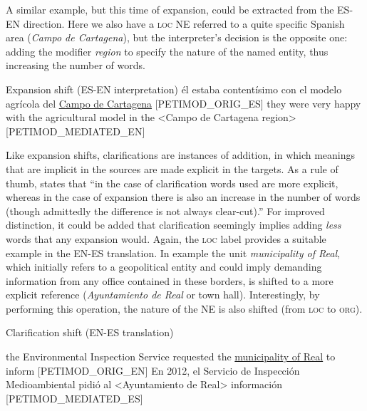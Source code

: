 \documentclass[output=paper]{langscibook}
\begin{document}
A similar example, but this time of expansion, could be extracted from the ES-EN direction. Here we also have a \textsc{loc}  NE referred to a quite specific Spanish area (\textit{Campo de Cartagena}), but the interpreter’s decision is the opposite one: adding the modifier \textit{region} to specify the nature of the named entity, thus increasing the number of words.

\ea\label{ex:corpas:4}
Expansion shift (ES-EN interpretation)
\ea
él estaba contentísimo con el modelo agrícola del \underline{Campo de Cartagena} [PETIMOD\_ORIG\_ES]
\ex
they were very happy with the agricultural model in the <Campo de Cartagena region> [PETIMOD\_MEDIATED\_EN]
\z
\z

Like expansion shifts, clarifications are instances of addition, in which meanings that are implicit in the sources are made explicit in the targets. As a rule of thumb, \citet[140]{Bernardini2016} states that “in the case of clarification words used are more explicit, whereas in the case of expansion there is also an increase in the number of words (though admittedly the difference is not always clear-cut).” For improved distinction, it could be added that clarification seemingly implies adding \textit{less} words that any expansion would. Again, the \textsc{loc} label provides a suitable example in the EN-ES translation. In example  the unit \textit{municipality of Real}, which initially refers to a geopolitical entity and could imply demanding information from any office contained in these borders, is shifted to a more explicit reference (\textit{Ayuntamiento de Real} or town hall). Interestingly, by performing this operation, the nature of the NE is also shifted (from \textsc{loc} to \textsc{org}).

\ea\label{ex:corpas:5}
Clarification shift (EN-ES translation)

\ea
the Environmental Inspection Service requested the \underline{municipality of Real} to inform [PETIMOD\_ORIG\_EN]
\ex
En 2012, el Servicio de Inspección Medioambiental pidió al <Ayuntamiento de Real> información [PETIMOD\_MEDIATED\_ES]
\z
\z
\end{document}
